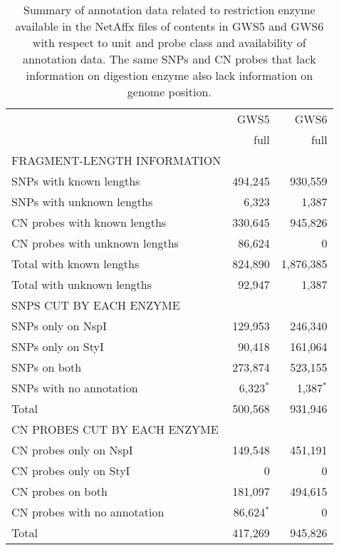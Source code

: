 \documentclass[11pt,a4paper]{article}
\newcommand{\GWSFive}{GWS5\xspace}
\newcommand{\GWSSix}{GWS6\xspace}
\begin{document}
\begin{table}
\begin{center}
\begin{tabular}{lrr}
                        &  \GWSFive &   \GWSSix \\
                        &  full     &   full    \\
\hline
FRAGMENT-LENGTH INFORMATION    	&	  				&	 				  \\
SNPs with known lengths         &  494,245  &   930,559 \\
SNPs with unknown lengths       &    6,323  &     1,387 \\
CN probes with known lengths    &  330,645  &   945,826 \\
CN probes with unknown lengths  &   86,624  &         0 \\
Total with known lengths        &  824,890  & 1,876,385 \\
Total with unknown lengths      &   92,947  &     1,387 \\
\hline
SNPS CUT BY EACH ENZYME      & 	  			&	 				  \\
SNPs only on NspI            &  129,953  &   246,340 \\
SNPs only on StyI            &   90,418  &   161,064 \\
SNPs on both                 &  273,874  &   523,155 \\
SNPs with no annotation      &    6,323\parbox{0mm}{$^*$}  &     1,387\parbox{0mm}{$^*$} \\
Total                        &  500,568  &   931,946 \\
\hline
CN PROBES CUT BY EACH ENZYME & 	  			&	 				  \\
CN probes only on NspI       &  149,548  &   451,191 \\
CN probes only on StyI       &        0  &         0 \\
CN probes on both            &  181,097  &   494,615 \\
CN probes with no annotation &   86,624\parbox{0mm}{$^*$}  &         0 \\
Total                        &  417,269  &   945,826 \\
\hline
\end{tabular}
\end{center}
\caption{Summary of annotation data related to restriction enzyme available in the NetAffx files of contents in \GWSFive and \GWSSix with respect to unit and probe class and availability of annotation data.  The same SNPs and CN probes that lack information on digestion enzyme also lack information on genome position.}
\label{tblEnzymeData}
\end{table}
\end{document}
